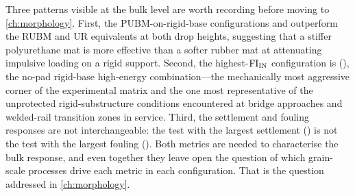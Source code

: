 Three patterns visible at the bulk level are worth recording before moving to \cref{ch:morphology}. First, the PUBM-on-rigid-base configurations  and  outperform the RUBM and UR equivalents at both drop heights, suggesting that a stiffer polyurethane mat is more effective than a softer rubber mat at attenuating impulsive loading on a rigid support. Second, the highest-$\mathrm{FI}_{\mathrm{IN}}$ configuration is  (), the no-pad rigid-base high-energy combination---the mechanically most aggressive corner of the experimental matrix and the one most representative of the unprotected rigid-substructure conditions encountered at bridge approaches and welded-rail transition zones in service. Third, the settlement and fouling responses are not interchangeable: the test with the largest settlement () is not the test with the largest fouling (). Both metrics are needed to characterise the bulk response, and even together they leave open the question of which grain-scale processes drive each metric in each configuration. That is the question addressed in \cref{ch:morphology}.
